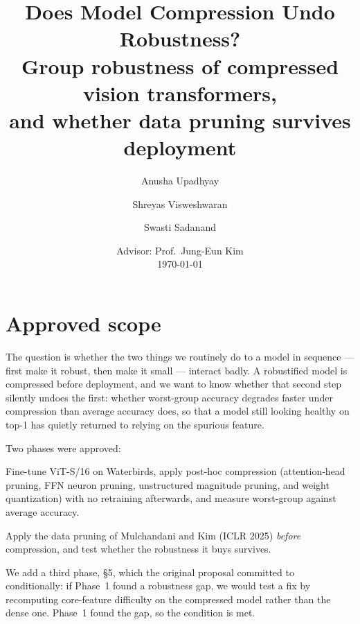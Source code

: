 \documentclass[11pt]{article}
\title{\vspace{-1.5em}Does Model Compression Undo Robustness?\\
\large Group robustness of compressed vision transformers,\\
and whether data pruning survives deployment}
\author{Anusha Upadhyay \and Shreyas Visweshwaran \and Swasti Sadanand}
\date{Advisor: Prof.\ Jung-Eun Kim \\[0.4em] \today}
\begin{document}
\maketitle

\vspace{-1.5em}
\begin{center}
\end{center}

\section{Approved scope}

The question is whether the two things we routinely do to a model in sequence ---
first make it robust, then make it small --- interact badly. A robustified model
is compressed before deployment, and we want to know whether that second step
silently undoes the first: whether worst-group accuracy degrades faster under
compression than average accuracy does, so that a model still looking healthy on
top-1 has quietly returned to relying on the spurious feature.

Two phases were approved:

\begin{description}[leftmargin=1.6em,style=nextline]
\item[Phase 1] Fine-tune ViT-S/16 on Waterbirds, apply post-hoc compression
(attention-head pruning, FFN neuron pruning, unstructured magnitude pruning, and
weight quantization) with no retraining afterwards, and measure worst-group
against average accuracy.
\item[Phase 2] Apply the data pruning of Mulchandani and Kim (ICLR 2025)
\emph{before} compression, and test whether the robustness it buys survives.
\end{description}

We add a third phase, \S5, which the original proposal committed to
conditionally: if Phase~1 found a robustness gap, we would test a fix by
recomputing core-feature difficulty on the compressed model rather than the dense
one. Phase~1 found the gap, so the condition is met.
\end{document}
